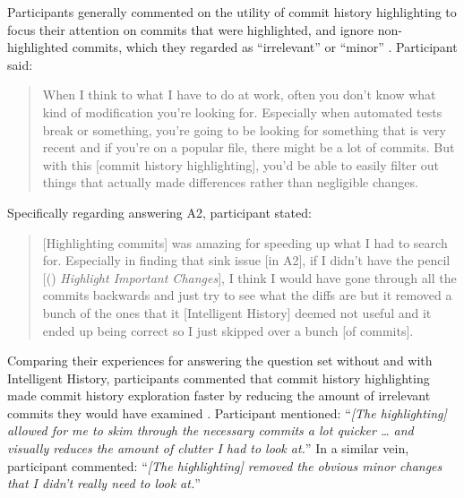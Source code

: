 Participants generally commented on the utility of commit history highlighting to focus their attention on commits that were highlighted, 
and ignore non-highlighted commits, which they regarded as ``irrelevant'' or ``minor'' .
Participant  said:

\begin{quote}
  When I think to what I have to do at work, 
  often you don’t know what kind of modification you’re looking for. 
  Especially when automated tests break or something, 
  you’re going to be looking for something that is very recent and if you’re on a popular file, 
  there might be a lot of commits. 
  But with this [commit history highlighting], 
  you’d be able to easily filter out things that actually made differences rather than negligible changes.
\end{quote}

Specifically regarding answering A2, participant  stated:

\begin{quote}
  [Highlighting commits] was amazing for speeding up what I had to search for. 
  Especially in finding that sink issue [in A2], if I didn’t have the pencil 
  [() \textit{Highlight Important Changes}], 
  I think I would have gone through all the commits backwards and just try to see what the diffs are 
  but it removed a bunch of the ones that it [Intelligent History] deemed not useful 
  and it ended up being correct so I just skipped over a bunch [of commits].
\end{quote}

Comparing their experiences for answering the question set without and with Intelligent History, 
participants commented that commit history highlighting made commit history exploration faster 
by reducing the amount of irrelevant commits they would have examined .
Participant  mentioned: 
``\textit{[The highlighting] allowed for me to skim through the necessary commits a lot quicker \dots 
and visually reduces the amount of clutter I had to look at.}''
In a similar vein, participant  commented:
``\textit{[The highlighting] removed the obvious minor changes that I didn’t really need to look at.}''

